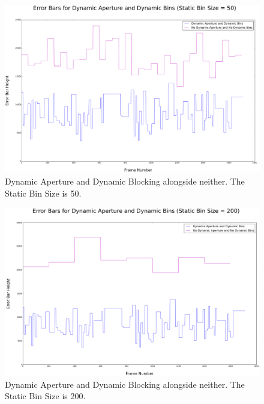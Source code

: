 \documentclass[12pt]{article}
\begin{document}
\begin{figure}[p]
\begin{center}
\includegraphics[scale = 0.3]{50.png}
\caption{Dynamic Aperture and Dynamic Blocking alongside neither. The Static Bin Size is 50.}
\end{center}
\end{figure}
\begin{figure}[p]
\begin{center}
\includegraphics[scale = 0.3]{200.png}
\caption{Dynamic Aperture and Dynamic Blocking alongside neither. The Static Bin Size is 200.}
\end{center}
\end{figure}
\end{document}

